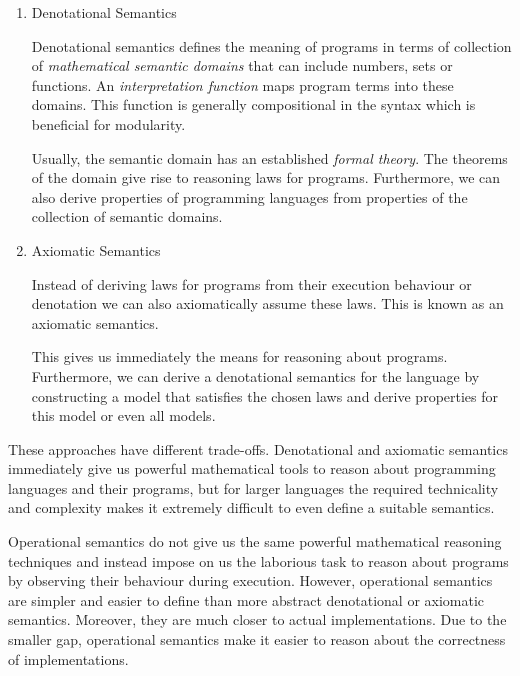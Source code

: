 {\begin{enumerate}
  Operational semantics defines the meaning of programs by specifying their
  execution in a state transition system. A \emph{state transition function} or
  a \emph{state transition relation} on the terms of the programming language
  defines the possible execution steps. The program is part of the state. For
  small languages the entire state might consist of only the program. After
  taking a step we are left with an updated state that includes a residual
  program.



\item Denotational Semantics

  Denotational semantics defines the meaning of programs in terms of collection
  of \emph{mathematical semantic domains} that can include numbers, sets or
  functions. An \emph{interpretation function} maps program terms into these
  domains. This function is generally compositional in the syntax which
  is beneficial for modularity.

  Usually, the semantic domain has an established \emph{formal theory}. The
  theorems of the domain give rise to reasoning laws for programs. Furthermore,
  we can also derive properties of programming languages from properties of the
  collection of semantic domains.

\item Axiomatic Semantics

  Instead of deriving laws for programs from their execution behaviour or
  denotation we can also axiomatically assume these laws. This is known as an
  axiomatic semantics.

  This gives us immediately the means for reasoning about programs. Furthermore,
  we can derive a denotational semantics for the language by constructing a
  model that satisfies the chosen laws and derive properties for this model or
  even all models.

\end{enumerate}

These approaches have different trade-offs. Denotational and axiomatic semantics
immediately give us powerful mathematical tools to reason about programming
languages and their programs, but for larger languages the required technicality
and complexity makes it extremely difficult to even define a suitable semantics.

Operational semantics do not give us the same powerful mathematical reasoning
techniques and instead impose on us the laborious task to reason about programs
by observing their behaviour during execution. However, operational semantics
are simpler and easier to define than more abstract denotational or axiomatic
semantics. Moreover, they are much closer to actual implementations. Due to the
smaller gap, operational semantics make it easier to reason about the
correctness of implementations.

}
